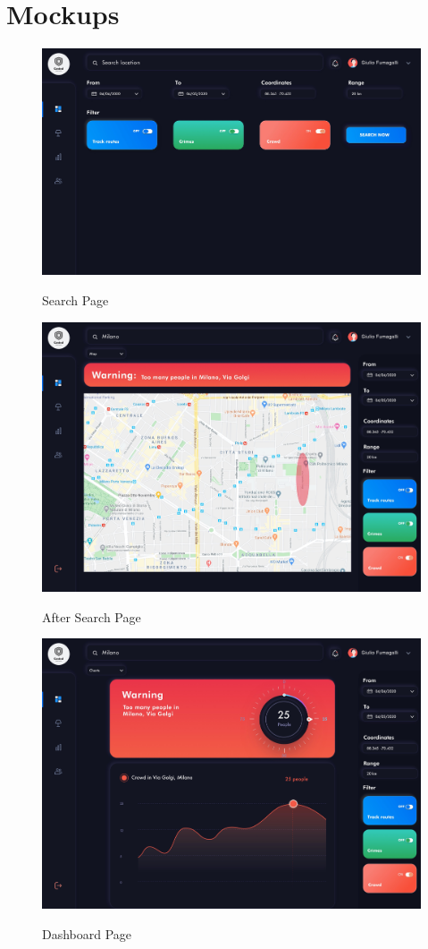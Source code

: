 \documentclass[../main.tex]{subfiles}
\begin{document}
    \chapter{Mockups}\label{ch:mockups}
    \begin{figure}[H]
        \centering
        \includegraphics[scale = 0.6]{assets/mockups/mock_search.png}\\
        \caption[]{Search Page}\label{fig:figure}
    \end{figure}
    \begin{figure}[H]
        \centering
        \includegraphics[scale = 0.6]{assets/mockups/mock_aftersearch.png}\\
        \caption[]{After Search Page}\label{fig:figure2}
    \end{figure}
    \newpage
    \begin{figure}[H]
        \centering
        \includegraphics[scale = 0.6]{assets/mockups/mock_dash.png}\\
        \caption[]{Dashboard Page}\label{fig:figure3}
    \end{figure}
\end{document}
